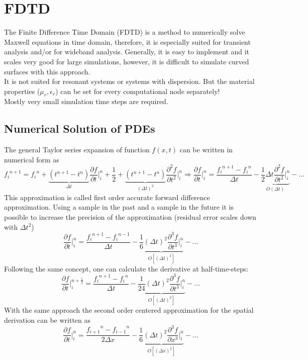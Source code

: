 \section{FDTD}
The Finite Difference Time Domain (FDTD) is a method to numerically solve Maxwell equations in time domain, therefore, it is especially suited for transient analysis and/or for wideband analysis. Generally, it is easy to implement and it scales very good for large simulations, however, it is difficult to simulate curved surfaces with this approach.\\
It is not suited for resonant systems or systems with dispersion. But the material properties ($\mu_r,\epsilon_r$) can be set for every computational node separately!\\ 
Mostly very small simulation time steps are required.

\subsection{Numerical Solution of PDEs}
The general Taylor series expansion of function $f(x,t)$ can be written in numerical form as 
\begin{equation*}
	{f_i}^{n+1}= {f_i}^n + \underbrace{\left(t^{n+1} - t^n\right)}_{\Delta t} \frac{\partial f}{\partial t} \bigg\rvert_{i}^{n} + \frac{1}{2} + \underbrace{\left(t^{n+1} - t^n\right)}_{\left(\Delta t\right)^2} \frac{\partial^2f}{\partial t^2} \bigg\rvert_{i}^{n} \Rightarrow \frac{\partial f}{\partial t} \bigg\rvert_{i}^{n} = \frac{{f_i}^{n+1}-{f_i}^n}{\Delta t} - \underbrace{\frac{1}{2}\Delta t \frac{\partial ^2 f}{\partial t^2}\bigg\rvert_{i}^{n}}_{O(\Delta t)} - \dots
\end{equation*}
This approximation is called first order accurate forward difference approximation. \newline Using a sample in the past and a sample in the future it is possible to increase the precision of the approximation (residual error scales down with $\Delta t^2$)
\begin{equation*}
	\frac{\partial f}{\partial t} \bigg\rvert_{i}^{n} = \frac{{f_i}^{n+1}-{f_i}^{n-1}}{\Delta t} - \underbrace{\frac{1}{6}\left(\Delta t\right)^2 \frac{\partial ^3 f}{\partial t^3}\bigg\rvert_{i}^{n}}_{O\left[(\Delta t)^2\right]} - \dots
\end{equation*}
Following the same concept, one can calculate the derivative at half-time-steps:
\begin{equation*}
	\frac{\partial f}{\partial t} \bigg\rvert_{i}^{n+\frac{1}{2}} = \frac{{f_i}^{n+1}-{f_i}^{n}}{\Delta t} - \underbrace{\frac{1}{24}\left(\Delta t\right)^2 \frac{\partial ^3 f}{\partial t^3}\bigg\rvert_{i}^{n}}_{O\left[(\Delta t)^2\right]} - \dots
\end{equation*}
With the same approach the second order centered approximation for the spatial derivation can be written as
\begin{equation*}
	\frac{\partial f}{\partial t} \bigg\rvert_{i}^{n} = \frac{{f_{i+1}}^{n}-{f_{i-1}}^{n}}{2\Delta x} - \underbrace{\frac{1}{6}\left(\Delta t\right)^2 \frac{\partial ^3 f}{\partial x^3}\bigg\rvert_{i}^{n}}_{O\left[(\Delta x)^2\right]} - \dots
\end{equation*}


